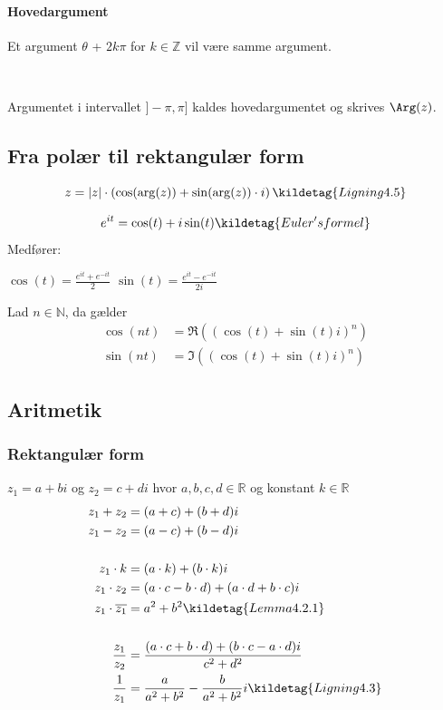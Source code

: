 
\paragraph{Hovedargument}

Et argument $\theta$ + $2k \pi$ for $k \in \mathbb{Z}$ vil være samme argument.

\

Argumentet i intervallet $]-\pi, \pi]$ kaldes hovedargumentet og skrives $\Arg(z)$.

\subsection{Fra polær til rektangulær form}
\[
    z = |z| \cdot \left(\cos(\arg(z)) + \sin(\arg(z)) \cdot i \right) \kildetag{Ligning 4.5}
\]

\[
    e^{it} = \cos(t) + i \sin(t) \kildetag{Euler's formel}
\]
Medfører:
\begin{center}
    $\cos(t) = \frac{e^{it} + e^{-it}}{2}$ \hfill
    $\sin(t) = \frac{e^{it} - e^{-it}}{2i}$ \hfill
\end{center}

Lad $n \in \mathbb{N}$, da gælder
\begin{align*}
    \cos(n t) &= \Re((\cos(t)+\sin(t)i)^n) \\
    \sin(n t) &= \Im((\cos(t)+\sin(t)i)^n)
\end{align*}



\subsection{Aritmetik}
\subsubsection{Rektangulær form}
$z_1 = a + bi$ og $z_2 = c + di$ hvor $a,b,c,d \in \mathbb{R}$ og konstant $k \in \mathbb{R}$
\begin{align*}
    z_1 + z_2 &= (a+c) + (b+d)i \\
    z_1 - z_2 &= (a-c) + (b-d)i \\
    \\
    z_1 \cdot k &= (a \cdot k) + (b \cdot k)i\\
    z_1 \cdot z_2 &= (a \cdot c - b \cdot d) + (a \cdot d + b \cdot c)i \\
    z_1 \cdot \overline{z_1} &= a^2 + b^2 
    \kildetag{Lemma 4.2.1} \\
    \\
    \frac{z_1}{z_2} &= \frac{(a \cdot c + b \cdot d) + (b \cdot c - a \cdot d)i}{c^2 + d^2} \\
    \frac{1}{z_1} &= \frac{a}{a^2 + b^2} - \frac{b}{a^2 + b^2}i 
    \kildetag{Ligning 4.3} \\
\end{align*}

